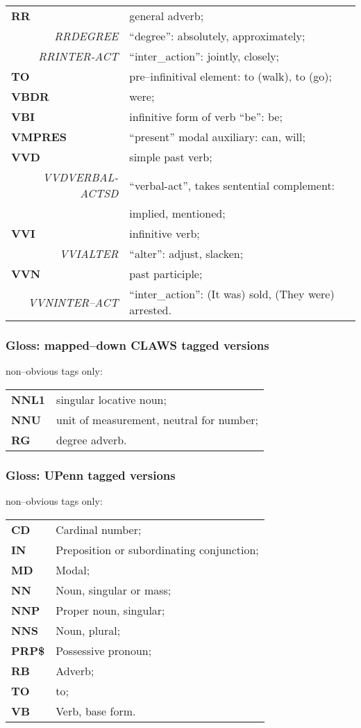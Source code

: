 \begin{tabular}{lll}
{\bf RR} & & general adverb;\\ 
\multicolumn{2}{r}{\em RRDEGREE} & ``degree'': absolutely, approximately;\\
\multicolumn{2}{r}{\em RRINTER-ACT} & ``inter\_action'': jointly, closely;\\ 
{\bf TO} & & pre--infinitival element: to (walk), to (go);\\ 
{\bf VBDR} & & were;\\ 
{\bf VBI} & & infinitive form of verb ``be'': be;\\ 
{\bf VMPRES} & & ``present'' modal auxiliary: can, will;\\ 
{\bf VVD} & & simple past verb;\\ 
\multicolumn{2}{r}{\em VVDVERBAL-ACTSD} & ``verbal-act'', takes sentential complement:\\
 & & implied, mentioned;\\ 
{\bf VVI} & & infinitive verb;\\
\multicolumn{2}{r}{\em VVIALTER} & ``alter'': adjust, slacken;\\ 
{\bf VVN} & & past participle;\\ 
\multicolumn{2}{r}{\em VVNINTER--ACT} & ``inter\_action'': (It was) sold, (They were) arrested.
\end{tabular}
\renewcommand{\arraystretch}{}

\subsubsection*{Gloss: mapped--down CLAWS tagged versions}
non--obvious tags only:\\
\renewcommand{\arraystretch}{}
\begin{tabular}{ll}
{\bf NNL1} & singular locative noun;\\ 
{\bf NNU} & unit of measurement, neutral for number;\\ 
{\bf RG} & degree adverb.
\end{tabular}
\renewcommand{\arraystretch}{}

\subsubsection*{Gloss: UPenn tagged versions}
non--obvious tags only: \\
\renewcommand{\arraystretch}{}
\begin{tabular}{ll}
{\bf CD} & Cardinal number;\\ 
{\bf IN} & Preposition or subordinating conjunction;\\ 
{\bf MD} & Modal;\\ 
{\bf NN} & Noun, singular or mass;\\ 
{\bf NNP} & Proper noun, singular;\\ 
{\bf NNS} & Noun, plural;\\ 
{\bf PRP\$} & Possessive pronoun;\\ 
{\bf RB} & Adverb;\\ 
{\bf TO} & to;\\ 
{\bf VB} & Verb, base form.
\end{tabular}
\renewcommand{\arraystretch}{}

